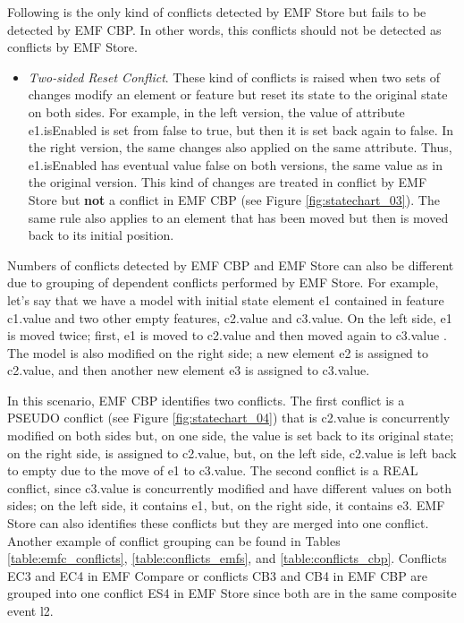 Following is the only kind of conflicts detected by EMF Store but fails to be detected by EMF CBP. In other words, this conflicts should not be detected as conflicts by EMF Store.
\begin{itemize}
  \item \emph{Two-sided Reset Conflict}. These kind of conflicts is raised when two sets of changes modify an element or feature but reset its state to the original state on both sides. For example, in the left version, the value of attribute \textsf{e1}.\textsf{isEnabled} is set from \textsf{false} to \textsf{true}, but then it is set back again to \textsf{false}. In the right version, the same changes also applied on the same attribute. Thus, \textsf{e1}.\textsf{isEnabled} has eventual value \textsf{false} on both versions, the same value as in the original version. This kind of changes are treated in conflict by EMF Store but \textbf{not} a conflict in EMF CBP (see Figure \ref{fig:statechart_03}). The same rule also applies to an element that has been moved but then is moved back to its initial position.
\end{itemize}

Numbers of conflicts detected by EMF CBP and EMF Store can also be different due to grouping of dependent conflicts performed by EMF Store. For example, let's say that we have a model with initial state element \textsf{e1} contained in feature \textsf{c1}.\textsf{value} and two other empty features, \textsf{c2}.\textsf{value} and \textsf{c3}.\textsf{value}. On the left side, \textsf{e1} is moved twice; first, \textsf{e1} is moved to \textsf{c2}.\textsf{value} and then moved again to \textsf{c3}.\textsf{value} . The model is also modified on the right side; a new element \textsf{e2} is assigned to \textsf{c2}.\textsf{value}, and then another new element \textsf{e3} is assigned to \textsf{c3}.\textsf{value}. 

In this scenario, EMF CBP identifies two conflicts. The first conflict is a \textsf{PSEUDO} conflict (see Figure \ref{fig:statechart_04}) that is \textsf{c2}.\textsf{value} is concurrently modified on both sides but, on one side, the value is set back to its original state; on the right side,  is assigned to \textsf{c2}.\textsf{value}, but, on the left side, \textsf{c2}.\textsf{value} is left back to empty due to the move of \textsf{e1} to \textsf{c3}.\textsf{value}. The second conflict is a \textsf{REAL} conflict, since \textsf{c3}.\textsf{value} is concurrently modified and have different values on both sides; on the left side, it contains \textsf{e1}, but, on the right side, it contains \textsf{e3}. EMF Store can also identifies these conflicts but they are merged into one conflict. Another example of conflict grouping can be found in Tables \ref{table:emfc_conflicts}, \ref{table:conflicts_emfs}, and \ref{table:conflicts_cbp}. Conflicts \textsf{EC3} and \textsf{EC4} in EMF Compare or conflicts \textsf{CB3} and \textsf{CB4} in EMF CBP are grouped into one conflict \textsf{ES4} in EMF Store since both are in the same composite event \textsf{l2}.


